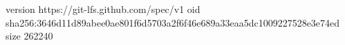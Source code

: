 version https://git-lfs.github.com/spec/v1
oid sha256:3646d11d89abee0ae801f6d5703a2f6f46e689a33eaa5dc1009227528e3e74ed
size 262240
